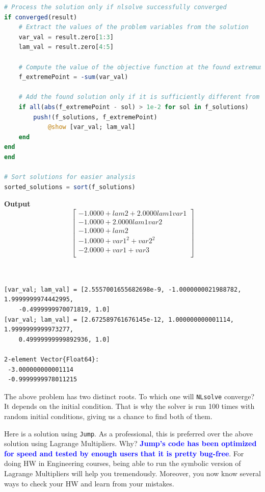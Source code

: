 \begin{lstlisting}[language=Julia,style=mystyle]
# Process the solution only if nlsolve successfully converged
if converged(result)
    # Extract the values of the problem variables from the solution
    var_val = result.zero[1:3]
    lam_val = result.zero[4:5]
    
    # Compute the value of the objective function at the found extremum
    f_extremePoint = -sum(var_val)
    
    # Add the found solution only if it is sufficiently different from the previously found solutions
    if all(abs(f_extremePoint - sol) > 1e-2 for sol in f_solutions)
        push!(f_solutions, f_extremePoint)
            @show [var_val; lam_val]
    end
end
end

# Sort solutions for easier analysis
sorted_solutions = sort(f_solutions)


\end{lstlisting}
\textbf{Output} 
\begin{equation}
\left[
\begin{array}{c}
-1.0000 + lam2 + 2.0000 lam1 var1 \\
-1.0000 + 2.0000 lam1 var2 \\
-1.0000 + lam2 \\
-1.0000 + var1^{2} + var2^{2} \\
-2.0000 + var1 + var3 \\
\end{array}
\right]
\end{equation}
\begin{verbatim}


[var_val; lam_val] = [2.5557001655682698e-9, -1.0000000021988782, 1.9999999974442995, 
    -0.4999999970071819, 1.0]
[var_val; lam_val] = [2.672589761676145e-12, 1.000000000001114, 1.9999999999973277, 
    0.49999999999892936, 1.0]
    
2-element Vector{Float64}:
 -3.000000000001114
 -0.9999999978011215
\end{verbatim}

\bigskip

\begin{rem} The above problem has two distinct roots. To which one will \texttt{NLsolve} converge? It depends on the initial condition. That is why the solver is run 100 times with random initial conditions, giving us a chance to find both of them.     
\end{rem}

\bigskip
Here is a solution using \texttt{Jump}. As a professional, this is preferred over the above solution using Lagrange Multipliers. Why? \textcolor{blue}{\bf Jump's code has been optimized for speed and tested by enough users that it is pretty bug-free}. For doing HW in Engineering courses, being able to run the symbolic version of Lagrange Multipliers will help you tremendously. Moreover, you now know several ways to check your HW and learn from your mistakes.\\

